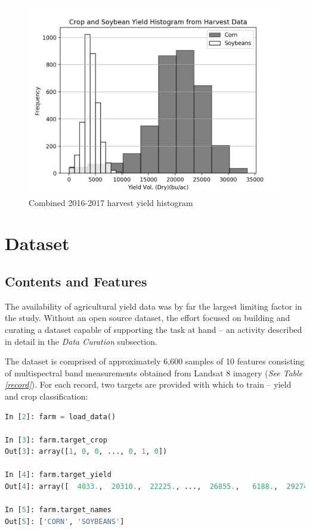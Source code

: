 \documentclass[conference]{IEEEtran}
\begin{document}
\begin{figure}[b]
\includegraphics[width=\linewidth]{histogram}
\caption{Combined 2016-2017 harvest yield histogram}
\end{figure}

\section{Dataset}
\subsection{Contents and Features}
The availability of agricultural yield data was by far the largest limiting factor in the study.  Without an open source dataset, the effort focused on building and curating a dataset capable of supporting the task at hand -- an activity described in detail in the \textit{Data Curation} subsection.

The dataset is comprised of approximately 6,600 samples of 10 features consisting of multispectral band measurements obtained from Landsat 8 imagery (\textit{See Table \ref{record}}). For each record, two targets are provided with which to train -- yield and crop classification:

\begin{lstlisting}[language=Python]
In [2]: farm = load_data()

In [3]: farm.target_crop
Out[3]: array([1, 0, 0, ..., 0, 1, 0])

In [4]: farm.target_yield
Out[4]: array([  4033.,  20310.,  22225., ...,  26855.,   6188.,  29274.])

In [5]: farm.target_names
Out[5]: ['CORN', 'SOYBEANS']
\end{lstlisting}
\label{target}
\end{document}
